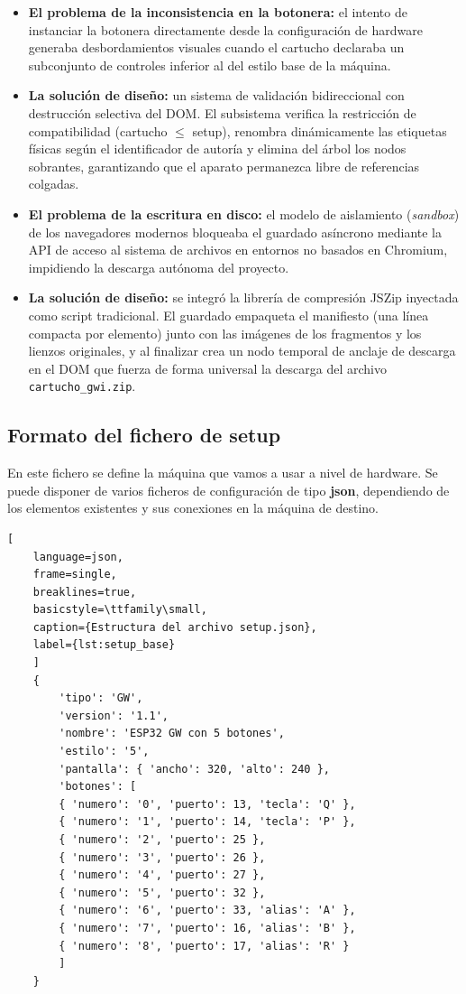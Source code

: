 \begin{itemize}
	\item \textbf{El problema de la inconsistencia en la botonera:} el
	intento de instanciar la botonera directamente desde la configuración
	de hardware generaba desbordamientos visuales cuando el cartucho
	declaraba un subconjunto de controles inferior al del estilo base de
	la máquina.
	\item \textbf{La solución de diseño:} un sistema de validación
	bidireccional con destrucción selectiva del DOM. El subsistema
	verifica la restricción de compatibilidad (cartucho $\leq$ setup),
	renombra dinámicamente las etiquetas físicas según el identificador de
	autoría y elimina del árbol los nodos sobrantes, garantizando que el
	aparato permanezca libre de referencias colgadas.
	\item \textbf{El problema de la escritura en disco:} el modelo de
	aislamiento (\emph{sandbox}) de los navegadores modernos bloqueaba el
	guardado asíncrono mediante la API de acceso al sistema de archivos
	en entornos no basados en Chromium, impidiendo la descarga autónoma
	del proyecto.
	\item \textbf{La solución de diseño:} se integró la librería de
	compresión JSZip inyectada como script tradicional. El guardado
	empaqueta el manifiesto (una línea compacta por elemento) junto con
	las imágenes de los fragmentos y los lienzos originales, y al
	finalizar crea un nodo temporal de anclaje de descarga en el DOM que
	fuerza de forma universal la descarga del archivo
	\texttt{cartucho\_gwi.zip}.
\end{itemize}

	\subsection{Formato del fichero de setup}

En este fichero se define la máquina que vamos a usar a nivel de hardware.
Se puede disponer de varios ficheros de configuración de tipo \textbf{json}, dependiendo de los elementos existentes y sus conexiones en la máquina de destino. 
\clearpage
\begin{lstlisting}[
	language=json, 
	frame=single, 
	breaklines=true, 
	basicstyle=\ttfamily\small,
	caption={Estructura del archivo setup.json},
	label={lst:setup_base}
	]
	{
		'tipo': 'GW',                                       
		'version': '1.1',                                   
		'nombre': 'ESP32 GW con 5 botones',                 
		'estilo': '5',                                      
		'pantalla': { 'ancho': 320, 'alto': 240 },          
		'botones': [                                        
		{ 'numero': '0', 'puerto': 13, 'tecla': 'Q' },  
		{ 'numero': '1', 'puerto': 14, 'tecla': 'P' },  
		{ 'numero': '2', 'puerto': 25 },                
		{ 'numero': '3', 'puerto': 26 },                
		{ 'numero': '4', 'puerto': 27 },
		{ 'numero': '5', 'puerto': 32 },
		{ 'numero': '6', 'puerto': 33, 'alias': 'A' },
		{ 'numero': '7', 'puerto': 16, 'alias': 'B' },
		{ 'numero': '8', 'puerto': 17, 'alias': 'R' }
		]
	}
\end{lstlisting}

